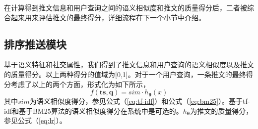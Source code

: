 在计算得到推文信息和用户查询之间的语义相似度和推文的质量得分后，二者被综合起来用来评估推文的最终得分，详细流程在下一个小节中介绍。

\subsection{排序推送模块}
\label{subsec2:scorePush}
基于语义特征和社交属性，我们得到了推文信息和用户查询的语义相似度以及推文的质量得分。以上两种得分的值域为[0,1]。对于一个用户查询，一条推文的最终得分考虑了以上的两个方面，形式化为如下所示，
\begin{equation}\label{fs}
  f\left( \mathbf{ts}, \mathbf{q} \right) = sim \cdot {h_ {\bm{\theta}}} \left(x\right)
\end{equation}
其中$sim$为语义相似度得分，参见公式（\ref{eq:tf-idf}）和公式（\ref{eq:bm25}）。基于tf-idf和基于BM25算法的语义相似度得分在系统中是可选的。$h_ {\bm{\theta}}$为推文的质量得分，参见公式（\ref{eq:lr}）。

